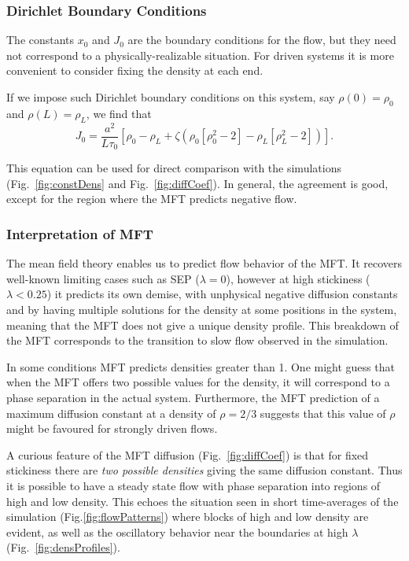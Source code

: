 \documentclass[
reprint, amsmath,amssymb,
]{revtex4-1}
\begin{document}
\subsubsection{Dirichlet Boundary Conditions}

The constants $x_0$ and $J_0$ are the boundary conditions for the
flow, but they need not correspond to a physically-realizable
situation.  For driven systems it is more convenient to consider fixing
the density at each end. 

If we impose such Dirichlet boundary conditions on this system, say
$\rho(0)=\rho_0$ and $\rho(L)=\rho_L$, we find that
\begin{equation}\label{eq:MFTflow}
 J_0 = \frac{a^2}{L \tau_0} \left[ \rho_0 - \rho_L + \zeta \left( \rho_0\left[\rho_0^2-2\right] - \rho_L\left[\rho_L^2-2\right] \right) \right].
\end{equation}

This equation can be used for direct comparison with the simulations
(Fig.~\ref{fig:constDens} and Fig.~\ref{fig:diffCoef}).  In general, the agreement is
good, except for the region where the MFT predicts negative flow.


\subsubsection{Interpretation of MFT}

The mean field theory enables us to predict flow behavior of the MFT.
It recovers well-known limiting cases such as SEP ($\lambda=0$),
however at high stickiness ($\lambda<0.25$) it predicts its own
demise, with unphysical negative diffusion constants and by having
multiple solutions for the density at some positions in the system,
meaning that the MFT does not give a unique density
profile.  This breakdown of the MFT corresponds to the transition to
slow flow observed in the simulation.

In some
conditions MFT predicts densities greater than 1.  One might guess that when the
MFT offers two possible values for the density, it will correspond to
a phase separation in the actual system. Furthermore,
the MFT prediction of a maximum diffusion constant at a density of
$\rho=2/3$ suggests that this value of $\rho$ might be favoured for
strongly driven flows.

A curious feature of the MFT diffusion (Fig.~\ref{fig:diffCoef}) is
that for fixed stickiness there are {\it two possible densities}
giving the same diffusion constant.  Thus it is possible to have a
steady state flow with phase separation into regions of high and low
density. This echoes the situation seen in short time-averages of the
simulation (Fig.\ref{fig:flowPatterns}) where blocks of high and low
density are evident, as well as the oscillatory behavior near the boundaries at high $\lambda$ (Fig.~\ref{fig:densProfiles}). 
\end{document}
